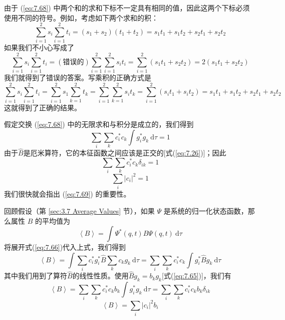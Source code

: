     由于 (\ref{eq:7.68}) 中两个和的求和下标不一定具有相同的值，因此这两个下标必须使用不同的符号。例如，考虑如下两个求和的积：
    \begin{equation*}
        \sum_{i=1}^{2}s_i\sum_{i=1}^{2}t_i = \left(s_1+s_2\right)\left(t_1+t_2\right) = s_1t_1 + s_1t_2 + s_2t_1 + s_2t_2
    \end{equation*}
    如果我们不小心写成了
    \begin{equation*}
        \sum_{i=1}^{2}s_i\sum_{i=1}^{2}t_i = \left(\text{错误的}\right)\sum_{i=1}^{2}\sum_{i=1}^{2}s_i t_i = \sum_{i=1}^{2}\left(s_1t_1+s_2t_2\right) = 2\left(s_1t_1+s_2t_2\right)
    \end{equation*}
    我们就得到了错误的答案。写乘积的正确方式是
    \begin{equation*}
        \sum_{i=1}^{2}s_i\sum_{i=1}^{2}t_i = \sum_{i=1}^{2}s_1\sum_{k=1}^{2}t_k = \sum_{i=1}^{2}\sum_{k=1}^{2}s_i t_k = \sum_{i=1}^{2}\left(s_it_1+s_it_2\right) = s_1t_1 + s_1t_2 + s_2t_1 + s_2t_2
    \end{equation*}
    这就得到了正确的结果。

    假定交换 (\ref{eq:7.68}) 中的无限求和与积分是成立的，我们得到
    \begin{equation*}
        \sum_{i}\sum_{k}c_i^{\ast}c_k\int g_i^{\ast}g_k\:\mathrm{d}\tau = 1
    \end{equation*}
    由于$\hat{B}$是厄米算符，它的本征函数之间应该是正交的[式(\ref{eq:7.26})]；因此
    \begin{equation*}
        \sum_i\sum_kc_i^{\ast}c_k\delta_{ik} = 1
    \end{equation*}
    \begin{equation}
        \sum_i\left|c_i\right|^2 = 1
        \label{eq:7.69}
    \end{equation}
    我们很快就会指出 (\ref{eq:7.69}) 的重要性。

    回顾假设（第 \ref{sec:3.7 Average Values} 节），如果 $\Psi$ 是系统的归一化状态函数，那么属性 $B$ 的平均值为
    \begin{equation*}
        \left\langle B \right\rangle = \int \Psi^{\ast}\left(q,t\right)\hat{B}\Psi\left(q,t\right)\:\mathrm{d}\tau
    \end{equation*}
    将展开式(\ref{eq:7.66})代入上式，我们得到
    \begin{equation*}
        \left\langle B \right\rangle = \int\sum_{i}c_i^{\ast}g_i^{\ast}\hat{B}\sum_{k}c_kg_k\:\mathrm{d}\tau = \sum_{i}\sum_{k}c_i^{\ast}c_k\int g_i^{\ast}\hat{B}g_k\:\mathrm{d}\tau
    \end{equation*}
    其中我们用到了算符$\hat{B}$的线性性质。使用$\hat{B}g_k = b_kg_k$[式(\ref{eq:7.65})]，我们有
    \begin{equation*}
        \left\langle B \right\rangle = \sum_{i}\sum_{k}c_i^{\ast}c_kb_k\int g_i^{\ast}g_k\:\mathrm{d}\tau = \sum_{i}\sum_{k}c_i^{\ast}c_kb_k\delta_{ik}
    \end{equation*}
    \begin{equation}
        \left\langle B \right\rangle = \sum_{i}\left|c_i\right|^2b_i
        \label{eq:7.70}
    \end{equation}

